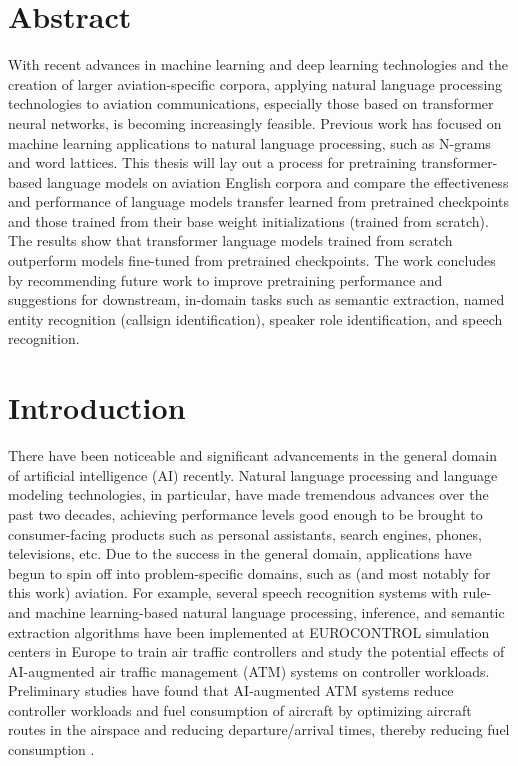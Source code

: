 \documentclass[12pt]{article}
\begin{document}
\section{Abstract}\label{sec:abstract}
With recent advances in machine learning and deep learning technologies and the creation of larger aviation-specific corpora, applying
natural language processing technologies to aviation communications, especially those based on transformer neural networks, is becoming
increasingly feasible. Previous work has focused on machine learning applications to natural language processing, such as N-grams and
word lattices. This thesis will lay out a process for pretraining transformer-based language models on aviation English corpora and
compare the effectiveness and performance of language models transfer learned from pretrained checkpoints and those trained from their
base weight initializations (trained from scratch). The results show that transformer language models trained from scratch outperform
models fine-tuned from pretrained checkpoints. The work concludes by recommending future work to improve pretraining performance and
suggestions for downstream, in-domain tasks such as semantic extraction, named entity recognition (callsign identification), speaker
role identification, and speech recognition.

\section{Introduction}\label{sec:introduction}
There have been noticeable and significant advancements in the general domain of artificial intelligence (AI) recently. Natural
language processing and language modeling technologies, in particular, have made tremendous advances over the past two decades,
achieving performance levels good enough to be brought to consumer-facing products such as personal assistants, search engines, phones,
televisions, etc. Due to the success in the general domain, applications have begun to spin off into problem-specific domains, such as
(and most notably for this work) aviation. For example, several speech recognition systems with rule- and machine learning-based
natural language processing, inference, and semantic extraction algorithms have been implemented at EUROCONTROL simulation centers in
Europe to train air traffic controllers and study the potential effects of AI-augmented air traffic management (ATM) systems on
controller workloads. Preliminary studies have found that AI-augmented ATM systems reduce controller workloads and fuel consumption of
aircraft by optimizing aircraft routes in the airspace and reducing departure/arrival times, thereby reducing fuel consumption
\cite{helmke_quantifying_2017}.
\end{document}

